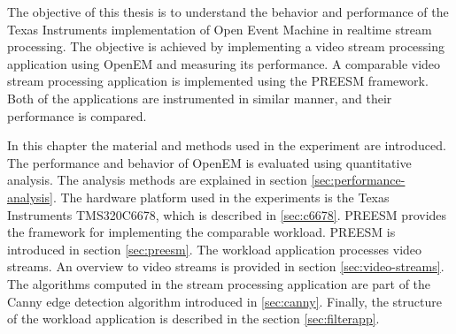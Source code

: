The objective of this thesis is to understand the behavior and performance of the Texas Instruments implementation of Open Event Machine in realtime stream processing. The objective is achieved by implementing a video stream processing application using OpenEM and measuring its performance. A comparable video stream processing application is implemented using the PREESM framework. Both of the applications are instrumented in similar manner, and their performance is compared.

In this chapter the material and methods used in the experiment are introduced. The performance and behavior of OpenEM is evaluated using quantitative analysis. The analysis methods are explained in section \ref{sec:performance-analysis}. The hardware platform used in the experiments is the Texas Instruments TMS320C6678, which is described in \ref{sec:c6678}. PREESM provides the framework for implementing the comparable workload. PREESM is introduced in section \ref{sec:preesm}. The workload application processes video streams. An overview to video streams is provided in section \ref{sec:video-streams}. The algorithms computed in the stream processing application are part of the Canny edge detection algorithm introduced in \ref{sec:canny}. Finally, the structure of the workload application is described in the section \ref{sec:filterapp}.
